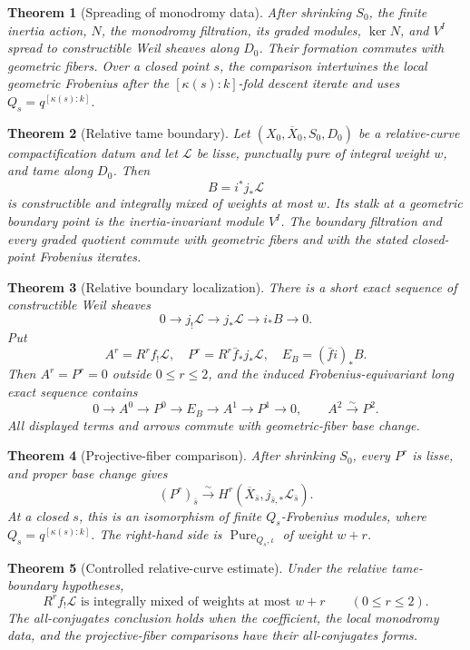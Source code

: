 \documentclass[10pt]{article}
\newtheorem{theorem}{Theorem}[section]
\theoremstyle{definition}
\newcommand{\Pure}{\operatorname{Pure}}
\begin{document}
\begin{theorem}[Spreading of monodromy data]
After shrinking \(S_0\), the finite inertia action, \(N\), the monodromy
filtration, its graded modules, \(\ker N\), and \(V^I\) spread to
constructible Weil sheaves along \(D_0\).  Their formation commutes with
geometric fibers.  Over a closed point \(s\), the comparison intertwines
the local geometric Frobenius after the
\([\kappa(s):k]\)-fold descent iterate and uses
\(Q_s=q^{[\kappa(s):k]}\).
\end{theorem}

\begin{theorem}[Relative tame boundary]
Let \((X_0,\overline X_0,S_0,D_0)\) be a relative-curve compactification
datum and let \(\mathcal L\) be lisse, punctually pure of integral weight
\(w\), and tame along \(D_0\).  Then
\[
                         B=i^*j_*\mathcal L
\]
is constructible and integrally mixed of weights at most \(w\).  Its stalk
at a geometric boundary point is the inertia-invariant module \(V^I\).
The boundary filtration and every graded quotient commute with geometric
fibers and with the stated closed-point Frobenius iterates.
\end{theorem}

\begin{theorem}[Relative boundary localization]
There is a short exact sequence of constructible Weil sheaves
\[
 0\longrightarrow j_!\mathcal L\longrightarrow j_*\mathcal L
   \longrightarrow i_*B\longrightarrow0.
\]
Put
\[
 A^r=R^rf_!\mathcal L,
 \quad P^r=R^r\bar f_*j_*\mathcal L,
 \quad E_B=(\bar f i)_*B.
\]
Then \(A^r=P^r=0\) outside \(0\le r\le2\), and the induced
Frobenius-equivariant long exact sequence contains
\[
 0\to A^0\to P^0\to E_B\to A^1\to P^1\to0,
 \qquad A^2\xrightarrow{\sim}P^2.
\]
All displayed terms and arrows commute with geometric-fiber base change.
\end{theorem}

\begin{theorem}[Projective-fiber comparison]
After shrinking \(S_0\), every \(P^r\) is lisse, and proper base change
gives
\[
 (P^r)_{\bar s}\xrightarrow{\sim}
 H^r(\overline X_{\bar s},j_{\bar s,*}\mathcal L_{\bar s}).
\]
At a closed \(s\), this is an isomorphism of finite
\(Q_s\)-Frobenius modules, where \(Q_s=q^{[\kappa(s):k]}\).  The right-hand
side is \(\Pure_{Q_s,\iota}\) of weight \(w+r\).
\end{theorem}

\begin{theorem}[Controlled relative-curve estimate]
Under the relative tame-boundary hypotheses,
\[
             R^rf_!\mathcal L
 \text{ is integrally mixed of weights at most }w+r
 \qquad(0\le r\le2).
\]
The all-conjugates conclusion holds when the coefficient, the local
monodromy data, and the projective-fiber comparisons have their
all-conjugates forms.
\end{theorem}
\end{document}

